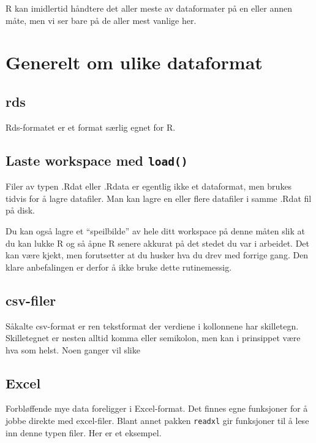 \documentclass[
  letterpaper,
  DIV=11,
  numbers=noendperiod]{scrreprt}
\theoremstyle{definition}
\theoremstyle{remark}
\begin{document}
R kan imidlertid håndtere det aller meste av dataformater på en eller
annen måte, men vi ser bare på de aller mest vanlige her.

\hypertarget{generelt-om-ulike-dataformat}{%
\section{Generelt om ulike
dataformat}\label{generelt-om-ulike-dataformat}}

\hypertarget{rds}{%
\subsection{rds}\label{rds}}

Rds-formatet er et format særlig egnet for R.

\hypertarget{laste-workspace-med-load}{%
\subsection{\texorpdfstring{Laste workspace med
\texttt{load()}}{Laste workspace med load()}}\label{laste-workspace-med-load}}

Filer av typen .Rdat eller .Rdata er egentlig ikke et dataformat, men
brukes tidvis for å lagre datafiler. Man kan lagre en eller flere
datafiler i samme .Rdat fil på disk.

Du kan også lagre et ``speilbilde'' av hele ditt workspace på denne
måten slik at du kan lukke R og så åpne R senere akkurat på det stedet
du var i arbeidet. Det kan være kjekt, men forutsetter at du husker hva
du drev med forrige gang. Den klare anbefalingen er derfor å ikke bruke
dette rutinemessig.

\hypertarget{csv-filer}{%
\subsection{csv-filer}\label{csv-filer}}

Såkalte csv-format er ren tekstformat der verdiene i kollonnene har
skilletegn. Skilletegnet er nesten alltid komma eller semikolon, men kan
i prinsippet være hva som helst. Noen ganger vil slike

\hypertarget{excel}{%
\subsection{Excel}\label{excel}}

Forbløffende mye data foreligger i Excel-format. Det finnes egne
funksjoner for å jobbe direkte med excel-filer. Blant annet pakken
\texttt{readxl} gir funksjoner til å lese inn denne typen filer. Her er
et eksempel.
\end{document}
